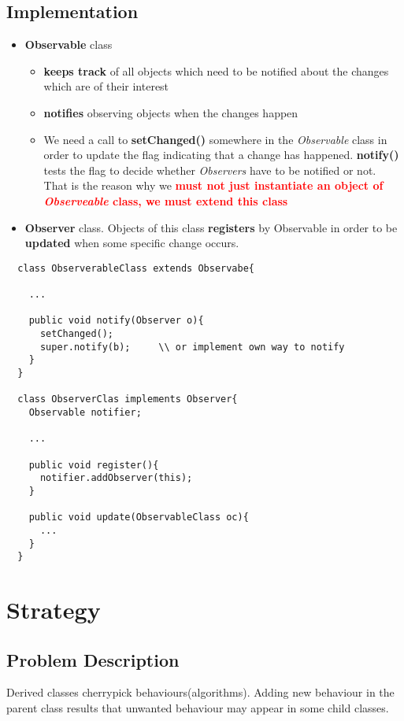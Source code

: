 \documentclass{report}
\begin{document}
\section{Implementation}
\begin{itemize}
	\item \textbf{Observable} class 
	\begin{itemize}
		\item \textbf{keeps track} of all objects which need to be notified about the changes which are of their interest
		\item \textbf{notifies} observing objects when the changes happen
		\item We need a call to \textbf{setChanged()} somewhere in the \textit{Observable} class in order to update the flag indicating that a change has happened.
		\textbf{notify()} tests the flag to decide whether \textit{Observers} have to be notified or not. That is the reason why we \textbf{\textcolor{red}{must not just instantiate an object of \textit{Observeable} class, we must extend this class}}
	\end{itemize}

	\item \textbf{Observer} class. Objects of this class \textbf{registers} by Observable in order to be \textbf{updated}
	when some specific change occurs.
\end{itemize}

\begin{verbatim}
  class ObserverableClass extends Observabe{
    
    ...
    
    public void notify(Observer o){
      setChanged();
      super.notify(b);     \\ or implement own way to notify
    }
  }
  
  class ObserverClas implements Observer{
    Observable notifier;
    
    ...
    
    public void register(){
      notifier.addObserver(this);
    }
    
    public void update(ObservableClass oc){
      ...
    }
  }
\end{verbatim}



\chapter{Strategy}


\section{Problem Description}
Derived classes cherrypick behaviours(algorithms). Adding new behaviour in the parent class results
that unwanted behaviour may appear in some child classes. 
 
\end{document}
